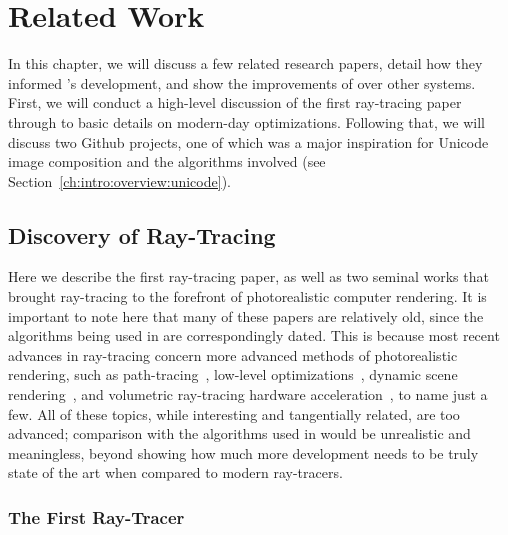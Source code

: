 %
%
\chapter{Related Work}
\label{ch:relatedwork}

In this chapter, we will discuss a few related research papers, detail how they informed \name{}'s development, and show the improvements of \name{} over other systems.
First, we will conduct a high-level discussion of the first ray-tracing paper through to basic details on modern-day optimizations.
Following that, we will discuss two Github projects, one of which was a major inspiration for Unicode image composition and the algorithms involved (see Section~\ref{ch:intro:overview:unicode}).

\section{Discovery of Ray-Tracing}
\label{ch:relatedwork:discovery}

Here we describe the first ray-tracing paper, as well as two seminal works that brought ray-tracing to the forefront of photorealistic computer rendering.
It is important to note here that many of these papers are relatively old, since the algorithms being used in \name{} are correspondingly dated.
This is because most recent advances in ray-tracing concern more advanced methods of photorealistic rendering, such as path-tracing~\cite{lafortune1993bi}, low-level optimizations~\cite{wald2001interactive}, dynamic scene rendering~\cite{wald2007ray}, and volumetric ray-tracing hardware acceleration~\cite{kruger2003acceleration}, to name just a few.
All of these topics, while interesting and tangentially related, are too advanced; comparison with the algorithms used in \name{} would be unrealistic and meaningless, beyond showing how much more development \name{} needs to be truly state of the art when compared to modern ray-tracers.

\subsection{The First Ray-Tracer}
\label{ch:relatedwork:discovery:first}

